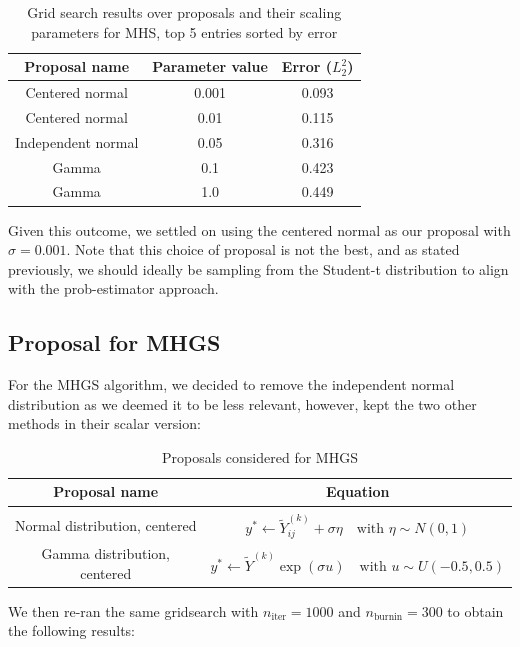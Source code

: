 \documentclass[12pt]{memoir}
\newcommand{\nitern}[1]{$n_{\text{iter}}=#1$}
\newcommand{\nburninn}[1]{$n_{\text{burnin}}=#1$}
\begin{document}
\begin{table}[H]

    \begin{center}
        \begin{tabular}{|c|c|c|}
            \hline
            Proposal name & Parameter value & Error ($L_2^2$)\\
            \hline\hline
            Centered normal& 0.001 & 0.093\\
            Centered normal&0.01  &0.115\\
            Independent normal& 0.05 &0.316\\
            Gamma&0.1  &0.423\\
            Gamma&1.0   &0.449\\\hline
        \end{tabular}
\end{center}
\caption{Grid search results over proposals and their scaling parameters for MHS, top 5 entries sorted by error}
\label{table:proposal-grid-search-mhs}
\end{table}
Given this outcome, we settled on using the centered normal as our proposal with $\sigma=0.001$. Note that this choice of proposal is not the best, and as stated previously, we should ideally be sampling from the Student-t distribution to align with the prob-estimator approach. 

\subsection*{Proposal for MHGS}
For the MHGS algorithm, we decided to remove the independent normal distribution as we deemed it to be less relevant, however, kept the two other methods in their scalar version:

\begin{table}[H]

    \begin{center}
        \begin{tabular}{|c|c|}
            \hline
            Proposal name & Equation\\
            \hline\hline
             & \\[-10pt]
            Normal distribution, centered & $y^* \gets \tilde Y^{(k)}_{ij} + \sigma {\eta} \quad\text{with } \eta \sim N(0,1)$\\
            Gamma distribution, centered & $y^* \gets \tilde Y^{(k)} \exp (\sigma u)\quad \text{with } {u} \sim U(-0.5, 0.5)$\\\hline
        \end{tabular}
\end{center}
\caption{Proposals considered for MHGS}
\label{table:proposal-comp-mhgs}
\end{table}
We then re-ran the same gridsearch with \nitern{1000} and \nburninn{300} to obtain the following results: 
\end{document}
